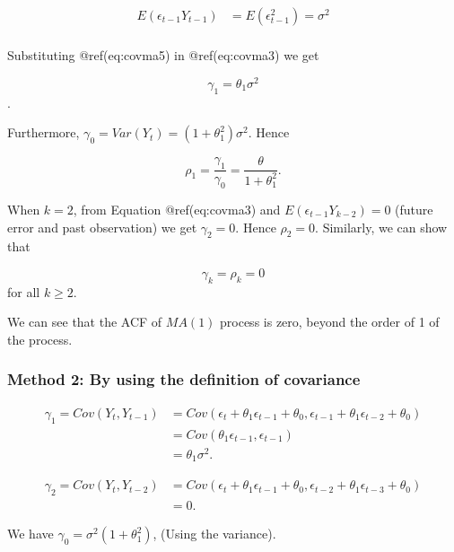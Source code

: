 \documentclass[
  11pt,
  a4paper,
]{report}
\begin{document}
\begin{equation}
\begin{aligned}
E(\epsilon_{t-1}Y_{t-1}) &= E(\epsilon_{t-1}^2)=\sigma^2\\
\end{aligned}
\end{equation}

Substituting @ref(eq:covma5) in @ref(eq:covma3) we get

\[\gamma_1=\theta_1\sigma^2\].

Furthermore, \(\gamma_0 = Var(Y_t)=  (1+\theta_1^2)\sigma^2\). Hence

\[\rho_1=\frac{\gamma_1}{\gamma_0}=\frac{\theta}{1+\theta_1^2}.\]

When \(k=2\), from Equation @ref(eq:covma3) and
\(E(\epsilon_{t-1}Y_{k-2}) = 0\) (future error and past observation) we
get \(\gamma_2=0\). Hence \(\rho_2=0\). Similarly, we can show that

\[\gamma_k = \rho_k=0\] for all \(k \geq 2\).

We can see that the ACF of \(MA(1)\) process is zero, beyond the order
of 1 of the process.

\subsubsection{Method 2: By using the definition of
covariance}\label{method-2-by-using-the-definition-of-covariance}

\begin{equation}
\begin{aligned}
\gamma_1 = Cov(Y_t, Y_{t-1}) &= Cov(\epsilon_t + \theta_1 \epsilon_{t-1}+ \theta_0, \epsilon_{t-1}+\theta_1 \epsilon_{t-2} + \theta_0)\\
&=Cov(\theta_1 \epsilon_{t-1}, \epsilon_{t-1})\\
&=\theta_1 \sigma^2.
\end{aligned}
\end{equation}

\begin{equation}
\begin{aligned}
\gamma_2=Cov(Y_t, Y_{t-2}) &= Cov(\epsilon_t + \theta_1 \epsilon_{t-1}+ \theta_0, \epsilon_{t-2}+\theta_1 \epsilon_{t-3} + \theta_0)\\
&=0.
\end{aligned}
\end{equation}

We have \(\gamma_0=\sigma^2(1+\theta_1^2)\), (Using the variance).
\end{document}
